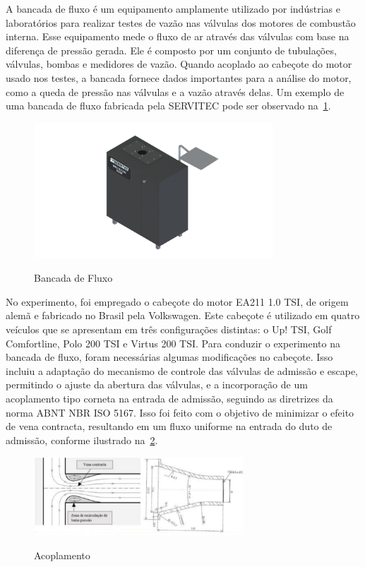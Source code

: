 A bancada de fluxo é um equipamento amplamente utilizado por indústrias e laboratórios para realizar testes de vazão nas válvulas dos motores de combustão interna. 
Esse equipamento mede o fluxo de ar através das válvulas com base na diferença de pressão gerada. 
Ele é composto por um conjunto de tubulações, válvulas, bombas e medidores de vazão. 
Quando acoplado ao cabeçote do motor usado nos testes, a bancada fornece dados importantes para a análise do motor, como a queda de pressão nas válvulas e a vazão através delas. 
Um exemplo de uma bancada de fluxo fabricada pela SERVITEC pode ser observado na~\cref{fig:bancada_fluxo}.
%
\begin{figure}[!htb]
    \centering
    \caption{Bancada de Fluxo}
    \includegraphics[width=0.8\textwidth]{figuras/banca_fluxo.png}
    \label{fig:bancada_fluxo}
\end{figure}
%
No experimento, foi empregado o cabeçote do motor EA211 1.0 TSI, de origem alemã e fabricado no Brasil pela Volkswagen. 
Este cabeçote é utilizado em quatro veículos que se apresentam em três configurações distintas: o Up! TSI, Golf Comfortline, Polo 200 TSI e Virtus 200 TSI. 
Para conduzir o experimento na bancada de fluxo, foram necessárias algumas modificações no cabeçote. Isso incluiu a adaptação do mecanismo de controle das válvulas de admissão e escape, permitindo o ajuste da abertura das válvulas, e a incorporação de um acoplamento tipo corneta na entrada de admissão, seguindo as diretrizes da norma ABNT NBR ISO 5167. 
Isso foi feito com o objetivo de minimizar o efeito de vena contracta, resultando em um fluxo uniforme na entrada do duto de admissão, conforme ilustrado na~\cref{fig:acoplamento}.
%
\begin{figure}[!htb]
    \centering
    \caption{Acoplamento}
    \includegraphics[width=0.7\textwidth]{figuras/acoplamento.png}
    \fonte{ }
    \label{fig:acoplamento}
\end{figure}
